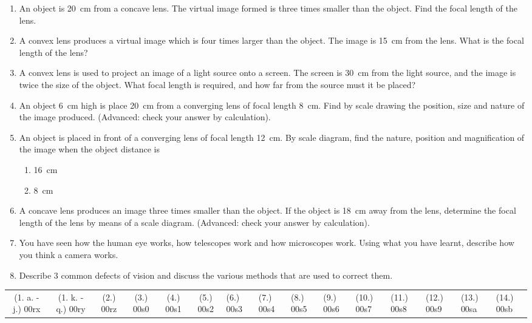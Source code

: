 \begin{eocexercises}{}
\begin{enumerate}
\item An object is 20~cm from a concave lens. The virtual image formed is three times smaller than the object. Find the focal length of the lens.
\item A convex lens produces a virtual image which is four times larger than the object. The image is 15~cm from the lens. What is the focal length of the lens?
\item A convex lens is used to project an image of a light source onto a screen. The screen is 30~cm from the light source, and the image is twice the size of the object. What focal length is required, and how far from the source must it be placed?
\item An object 6~cm high is place 20~cm from a converging lens of focal length 8~cm. Find by scale drawing the position, size and nature of the image produced. (Advanced: check your answer by calculation).
\item An object is placed in front of a converging lens of focal length 12~cm. By scale diagram, find the nature, position and magnification of the image when the object distance is
\begin{enumerate}
\item 16~cm
\item 8~cm
\end{enumerate}
\item A concave lens produces an image three times smaller than the object. If the object is 18~cm away from the lens, determine the focal length of the lens by means of a scale diagram. (Advanced: check your answer by calculation).
\item You have seen how the human eye works, how telescopes work and how microscopes work. Using what you have learnt, describe how you think a camera works.
\item Describe 3 common defects of vision and discuss the various methods that are used to correct them.

\end{enumerate}
\practiceinfo

\begin{tabular}[h]{cccccc}
(1. a. - j.) 00rx & (1. k. - q.) 00ry & (2.) 00rz & (3.) 00s0 & (4.) 00s1 & (5.) 00s2 & (6.) 00s3 & (7.) 00s4 & (8.) 00s5 & (9.) 00s6 & (10.) 00s7 & (11.) 00s8 & (12.) 00s9 & (13.) 00sa & (14.) 00sb & 
 \end{tabular}
\end{eocexercises}





